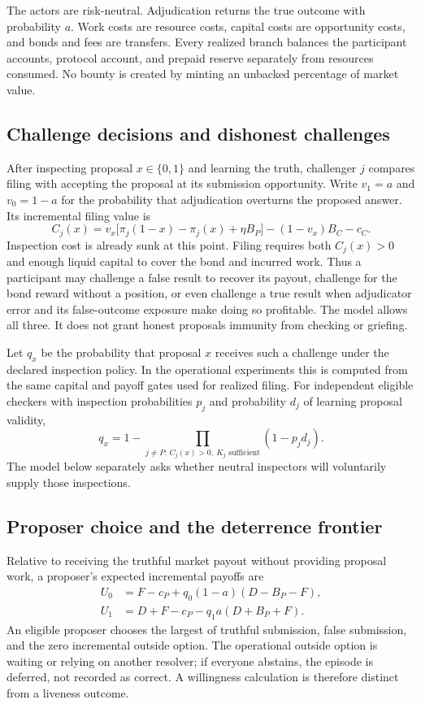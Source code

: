 \documentclass[10pt]{article}
\begin{document}
The actors are risk-neutral. Adjudication returns the true outcome with probability $a$. Work costs are resource costs, capital costs are opportunity costs, and bonds and fees are transfers. Every realized branch balances the participant accounts, protocol account, and prepaid reserve separately from resources consumed. No bounty is created by minting an unbacked percentage of market value.

\subsection{Challenge decisions and dishonest challenges}

After inspecting proposal $x\in\{0,1\}$ and learning the truth, challenger $j$ compares filing with accepting the proposal at its submission opportunity. Write $v_1=a$ and $v_0=1-a$ for the probability that adjudication overturns the proposed answer. Its incremental filing value is
\begin{equation}
C_j(x)=v_x\bigl[\pi_j(1-x)-\pi_j(x)+\eta B_P\bigr]
       -(1-v_x)B_C-c_C.
\label{eq:challenge}
\end{equation}
Inspection cost is already sunk at this point. Filing requires both $C_j(x)>0$ and enough liquid capital to cover the bond and incurred work. Thus a participant may challenge a false result to recover its payout, challenge for the bond reward without a position, or even challenge a true result when adjudicator error and its false-outcome exposure make doing so profitable. The model allows all three. It does not grant honest proposals immunity from checking or griefing.

Let $q_x$ be the probability that proposal $x$ receives such a challenge under the declared inspection policy. In the operational experiments this is computed from the same capital and payoff gates used for realized filing. For independent eligible checkers with inspection probabilities $p_j$ and probability $d_j$ of learning proposal validity,
\[
q_x=1-\prod_{j\ne P:\,C_j(x)>0,\ K_j\text{ sufficient}}(1-p_jd_j).
\]
The model below separately asks whether neutral inspectors will voluntarily supply those inspections.

\subsection{Proposer choice and the deterrence frontier}

Relative to receiving the truthful market payout without providing proposal work, a proposer's expected incremental payoffs are
\begin{align}
U_0&=F-c_P+q_0(1-a)(D-B_P-F),\label{eq:truthful_utility}\\
U_1&=D+F-c_P-q_1a(D+B_P+F).\label{eq:false_utility}
\end{align}
An eligible proposer chooses the largest of truthful submission, false submission, and the zero incremental outside option. The operational outside option is waiting or relying on another resolver; if everyone abstains, the episode is deferred, not recorded as correct. A willingness calculation is therefore distinct from a liveness outcome.
\end{document}
